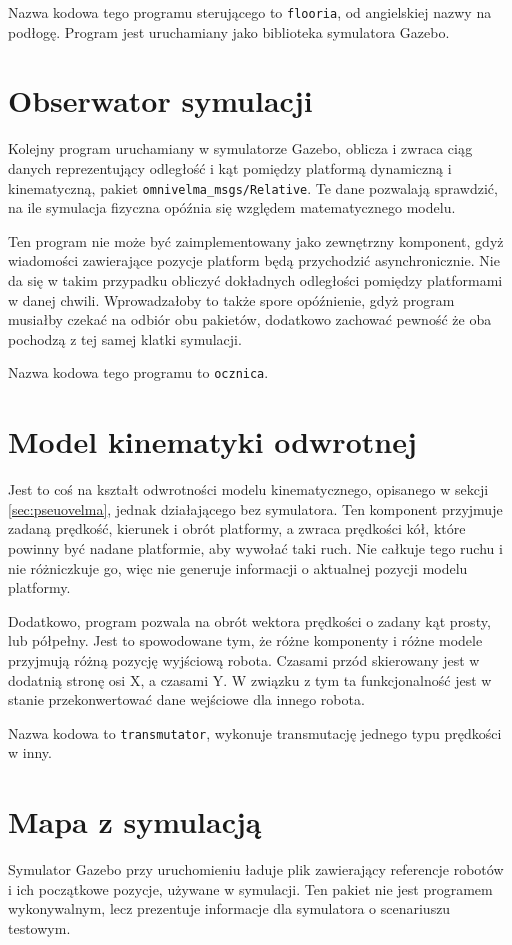 	Nazwa kodowa tego programu sterującego to \texttt{flooria}, od angielskiej nazwy na podłogę.
	Program jest uruchamiany jako biblioteka symulatora Gazebo.
	
\section{Obserwator symulacji}
	\label{sec:ocznica}
	Kolejny program uruchamiany w symulatorze Gazebo, oblicza i zwraca ciąg danych reprezentujący 
	odległość i kąt pomiędzy platformą dynamiczną i kinematyczną, pakiet \texttt{omnivelma\_msgs/Relative}.
	Te dane pozwalają sprawdzić, na ile symulacja fizyczna opóźnia się względem matematycznego modelu.
	
	Ten program nie może być zaimplementowany jako zewnętrzny komponent, gdyż wiadomości zawierające pozycje platform będą przychodzić asynchronicznie.
	Nie da się w takim przypadku obliczyć dokładnych odległości pomiędzy platformami w danej chwili. 
	Wprowadzałoby to także spore opóźnienie, gdyż program musiałby czekać na odbiór obu pakietów, dodatkowo zachować pewność że oba pochodzą z tej samej klatki symulacji.
	
	Nazwa kodowa tego programu to \texttt{ocznica}.
	
\section{Model kinematyki odwrotnej}
	Jest to coś na kształt odwrotności modelu kinematycznego, opisanego w sekcji \ref{sec:pseuovelma}, jednak działającego bez symulatora.
	Ten komponent przyjmuje zadaną prędkość, kierunek i obrót platformy, a zwraca prędkości kół, które powinny być nadane platformie, aby wywołać taki ruch.
	Nie całkuje tego ruchu i nie różniczkuje go, więc nie generuje informacji o aktualnej pozycji modelu platformy.
	
	
	Dodatkowo, program pozwala na obrót wektora prędkości o zadany kąt prosty, lub półpełny. 
	Jest to spowodowane tym, że różne komponenty i różne modele przyjmują różną pozycję wyjściową robota.
	Czasami przód skierowany jest w dodatnią stronę osi X, a czasami Y. W związku z tym ta funkcjonalność jest w stanie przekonwertować dane wejściowe dla innego robota.
	
	Nazwa kodowa to \texttt{transmutator}, wykonuje transmutację jednego typu prędkości w inny.
	
\section{Mapa z symulacją}
	Symulator Gazebo przy uruchomieniu ładuje plik zawierający referencje robotów i ich początkowe pozycje, używane w symulacji.
	Ten pakiet nie jest programem wykonywalnym, lecz prezentuje informacje dla symulatora o scenariuszu testowym.
	
